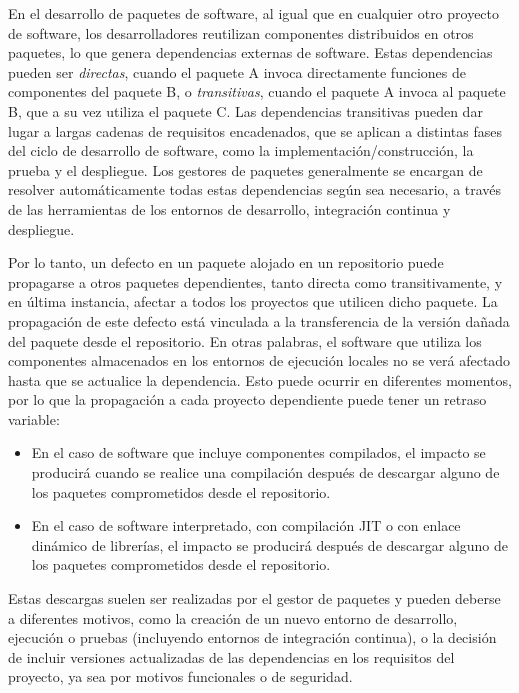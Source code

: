 En el desarrollo de paquetes de software, al igual que en cualquier otro proyecto de software,
los desarrolladores reutilizan componentes distribuidos en otros paquetes, lo que genera dependencias
externas de software. Estas dependencias pueden ser \textit{directas}, cuando el paquete A invoca
directamente funciones de componentes del paquete B, o \textit{transitivas}, cuando el paquete A
invoca al paquete B, que a su vez utiliza el paquete C.
Las dependencias transitivas pueden dar lugar a largas cadenas de requisitos encadenados, que se
aplican a distintas fases del ciclo de desarrollo de software, como la implementación/construcción,
la prueba y el despliegue. Los gestores de paquetes generalmente se encargan de resolver automáticamente
todas estas dependencias según sea necesario, a través de las herramientas de los entornos de desarrollo,
integración continua y despliegue.

Por lo tanto, un defecto en un paquete alojado en un repositorio puede propagarse a otros paquetes
dependientes, tanto directa como transitivamente, y en última instancia, afectar a todos los proyectos
que utilicen dicho paquete. La propagación de este defecto está vinculada a la transferencia de la
versión dañada del paquete desde el repositorio. En otras palabras, el software que utiliza los
componentes almacenados en los entornos de ejecución locales no se verá afectado hasta que se
actualice la dependencia. Esto puede ocurrir en diferentes momentos, por lo que la propagación
a cada proyecto dependiente puede tener un retraso variable:

\begin{itemize}
    \item En el caso de software que incluye componentes compilados, el impacto se producirá cuando
          se realice una compilación después de descargar alguno de los paquetes comprometidos desde el
          repositorio.
    \item En el caso de software interpretado, con compilación JIT o con enlace dinámico de librerías,
          el impacto se producirá después de descargar alguno de los paquetes comprometidos desde el
          repositorio.
\end{itemize}

Estas descargas suelen ser realizadas por el gestor de paquetes y pueden deberse a diferentes motivos,
como la creación de un nuevo entorno de desarrollo, ejecución o pruebas (incluyendo entornos de
integración continua), o la decisión de incluir versiones actualizadas de las dependencias en los
requisitos del proyecto, ya sea por motivos funcionales o de seguridad.

